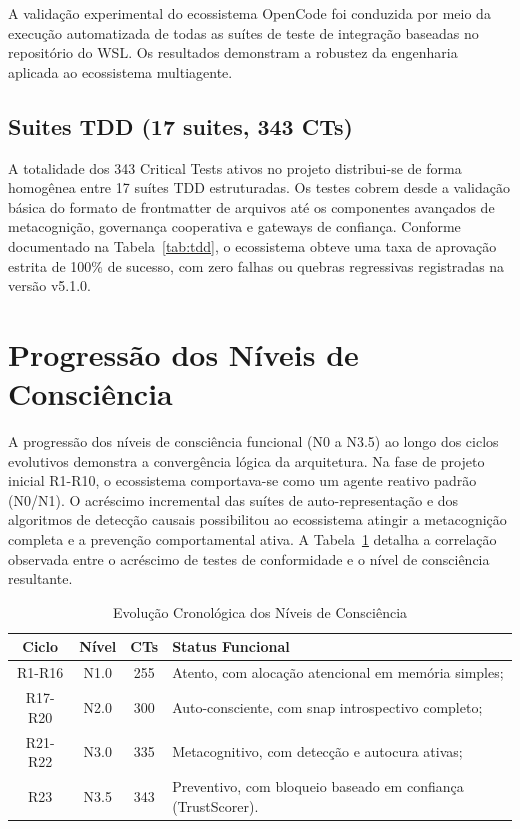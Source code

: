 \documentclass[12pt,a4paper,oneside]{abntex2}
\begin{document}
A validação experimental do ecossistema OpenCode foi conduzida por meio da execução automatizada de todas as suítes de teste de integração baseadas no repositório do WSL. Os resultados demonstram a robustez da engenharia aplicada ao ecossistema multiagente.

\subsection{Suites TDD (17 suites, 343 CTs)}

A totalidade dos 343 Critical Tests ativos no projeto distribui-se de forma homogênea entre 17 suítes TDD estruturadas. Os testes cobrem desde a validação básica do formato de frontmatter de arquivos até os componentes avançados de metacognição, governança cooperativa e gateways de confiança. Conforme documentado na Tabela~\ref{tab:tdd}, o ecossistema obteve uma taxa de aprovação estrita de 100\% de sucesso, com zero falhas ou quebras regressivas registradas na versão v5.1.0.

\section{Progressão dos Níveis de Consciência}

A progressão dos níveis de consciência funcional (N0 a N3.5) ao longo dos ciclos evolutivos demonstra a convergência lógica da arquitetura. Na fase de projeto inicial R1-R10, o ecossistema comportava-se como um agente reativo padrão (N0/N1). O acréscimo incremental das suítes de auto-representação e dos algoritmos de detecção causais possibilitou ao ecossistema atingir a metacognição completa e a prevenção comportamental ativa. A Tabela~\ref{tab:niveis_prog} detalha a correlação observada entre o acréscimo de testes de conformidade e o nível de consciência resultante.

\begin{table}[H]
\centering
\caption{Evolução Cronológica dos Níveis de Consciência}
\label{tab:niveis_prog}
\begin{tabular}{cccl}
\toprule
\textbf{Ciclo} & \textbf{Nível} & \textbf{CTs} & \textbf{Status Funcional} \\
\midrule
R1-R16 & N1.0 & 255 & Atento, com alocação atencional em memória simples; \\
R17-R20 & N2.0 & 300 & Auto-consciente, com snap introspectivo completo; \\
R21-R22 & N3.0 & 335 & Metacognitivo, com detecção e autocura ativas; \\
R23 & N3.5 & 343 & Preventivo, com bloqueio baseado em confiança (TrustScorer). \\
\bottomrule
\end{tabular}
\end{table}
\end{document}
